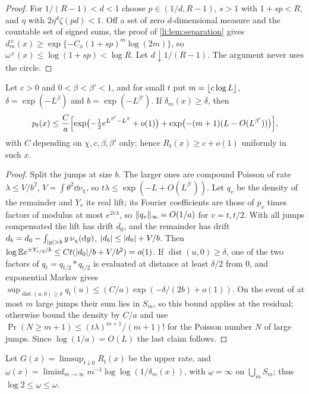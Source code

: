 \begin{proof}
For $1/(R-1)<d<1$ choose $p\in(1/d,R-1)$, $s>1$ with $1+sp<R$, and $\eta$ with $2\eta^d\zeta(pd)<1$. Off a set of
zero $d$-dimensional measure and the countable set of signed sums, the proof of \cref{li:lem:separation}
gives $d_m^\pm(x)\ge\exp\{-C_x(1+sp)^m\log(2m)\}$, so $\omega^\pm(x)\le\log(1+sp)<\log R$. Let $d\downarrow1/(R-1)$. The
argument never uses the circle.
\end{proof}

\begin{lemma}\label{li:lem:decay}
Let $c>0$ and $0<\beta<\beta'<1$, and for small $t$ put $m=\lfloor c\log L\rfloor$, $\delta=\exp(-L^\beta)$ and $b=\exp(-L^{\beta'})$.
If $\delta_m(x)\ge\delta$, then
\[
 p_t(x)\le\frac Ca\Bigl[\exp\bigl(-\tfrac12e^{L^{\beta'}-L^\beta}+o(1)\bigr)+\exp\bigl(-(m+1)(L-O(L^{\beta'}))\bigr)\Bigr],
\]
with $C$ depending on $\chi,c,\beta,\beta'$ only; hence $R_t(x)\ge c+o(1)$ uniformly in such $x$.
\end{lemma}

\begin{proof}
Split the jumps at size $b$. The larger ones are compound Poisson of rate $\lambda\le V/b^2$,
$V=\int\theta^2\dd\nu_\chi$, so $t\lambda\le\exp(-L+O(L^{\beta'}))$. Let $q_v$ be the density of the remainder and $Y_v$ its
real lift; its Fourier coefficients are those of $p_v$ times factors of modulus at most $e^{2v\lambda}$, so
$\lVert q_v\rVert_\infty=O(1/a)$ for $v=t,t/2$. With all jumps compensated the lift has drift $d_0$, and the
remainder has drift $d_b=d_0-\int_{\lvert y\rvert>b}y\,\nu_\chi(\mathrm{d} y)$, $\lvert d_b\rvert\le\lvert d_0\rvert+V/b$. Then
$\log\mathbb{E} e^{\pm Y_{t/2}/b}\le Ct(\lvert d_0\rvert/b+V/b^2)=o(1)$. If $\operatorname{dist}(u,0)\ge\delta$, one of the two factors of
$q_t=q_{t/2}*q_{t/2}$ is evaluated at distance at least $\delta/2$ from $0$, and exponential Markov gives
$\sup_{\operatorname{dist}(u,0)\ge\delta}q_t(u)\le(C/a)\exp(-\delta/(2b)+o(1))$. On the event of at most $m$ large jumps their sum
lies in $S_m$, so this bound applies at the residual; otherwise bound the density by $C/a$ and use
$\Pr(N\ge m+1)\le(t\lambda)^{m+1}/(m+1)!$ for the Poisson number $N$ of large jumps. Since $\log(1/a)=O(L)$ the last
claim follows.
\end{proof}

Let $G(x)=\limsup_{t\downarrow0}R_t(x)$ be the upper rate, and
$\underline\omega(x)=\liminf_{m\to\infty}m^{-1}\log\log(1/\delta_m(x))$, with $\underline\omega=\infty$ on $\bigcup_mS_m$; thus
$\log2\le\underline\omega\le\omega$.

